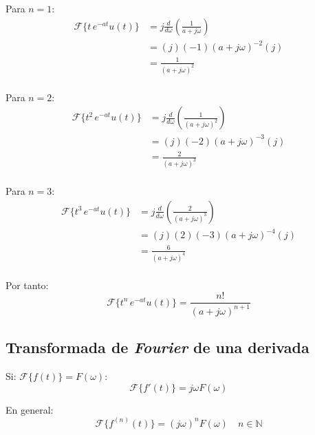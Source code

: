 Para $n=1$:
\begin{equation*}
\begin{split}
    \mathcal{F}\{t\,e^{-at} u(t)\}
        &=j\frac{d}{d\omega}\left(\frac{1}{a+j\omega}\right)\\
        &=(j)(-1){(a+j\omega)}^{-2}(j)\\
        &=\frac{1}{{(a+j\omega)}^2}\\
\end{split}
\end{equation*}

Para $n=2$:
\begin{equation*}
\begin{split}
    \mathcal{F}\{t^2\,e^{-at} u(t)\}
        &=j\frac{d}{d\omega}\left(\frac{1}{{(a+j\omega)}^2}\right)\\
        &=(j)(-2){(a+j\omega)}^{-3}(j)\\
        &=\frac{2}{{(a+j\omega)}^3}\\
\end{split}
\end{equation*}

Para $n=3$:
\begin{equation*}
\begin{split}
    \mathcal{F}\{t^3\,e^{-at} u(t)\}
        &=j\frac{d}{d\omega}\left(\frac{2}{{(a+j\omega)}^3}\right)\\
        &=(j)(2)(-3){(a+j\omega)}^{-4}(j)\\
        &=\frac{6}{{(a+j\omega)}^4}\\
\end{split}
\end{equation*}

Por tanto:
\begin{equation}
    \mathcal{F}\{t^n\,e^{-at} u(t)\}=\frac{n!}{{(a+j\omega)}^{n+1}}
\end{equation}

\subsection{Transformada de \emph{Fourier} de una derivada}
Si: $\mathcal{F}\{f(t)\}=F(\omega)$:
\begin{equation*}
    \mathcal{F}\{f'(t)\}=j\omega F(\omega)
\end{equation*}

En general:
\begin{equation}
    \mathcal{F}\{f^{(n)}(t)\}={(j\omega)}^n F(\omega)
    \quad n\in\mathbb{N}
\end{equation}

